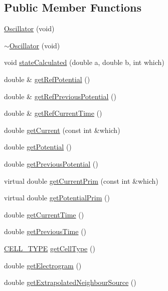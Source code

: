 \subsection*{Public Member Functions}
\begin{DoxyCompactItemize}
\item 
\hyperlink{class_oscillator_aad43fa7eeffdeb0cbc4767f2de538d80}{Oscillator} (void)
\item 
\hyperlink{class_oscillator_accb2f4ecc6604b2c38a7fd9973578360}{$\sim$\+Oscillator} (void)
\item 
void \hyperlink{class_oscillator_abc5d43aeb061d97dd58749baf2b8f82d}{state\+Calculated} (double a, double b, int which)
\item 
double \& \hyperlink{class_oscillator_a6d6d8ef3c022f6fd8c31c3e50987a822}{get\+Ref\+Potential} ()
\item 
double \& \hyperlink{class_oscillator_a734d7375586e9982a6419d1f08b63c57}{get\+Ref\+Previous\+Potential} ()
\item 
double \& \hyperlink{class_oscillator_ac82b2732257e64c0f84f5b520ef16704}{get\+Ref\+Current\+Time} ()
\item 
double \hyperlink{class_oscillator_a2dcfd98ad9d0c6e03cc07f84dd5f054a}{get\+Current} (const int \&which)
\item 
double \hyperlink{class_oscillator_a6ababfb0cb31e5dbf26b4d60a0d0bb16}{get\+Potential} ()
\item 
double \hyperlink{class_oscillator_a6272096989cb47a1cf43fd3aee78fdf5}{get\+Previous\+Potential} ()
\item 
virtual double \hyperlink{class_oscillator_a6132c7be8737a5686d64629b68b81743}{get\+Current\+Prim} (const int \&which)
\item 
virtual double \hyperlink{class_oscillator_a932fda2705d851fbe28c569547f4b4f1}{get\+Potential\+Prim} ()
\item 
double \hyperlink{class_oscillator_a6e403f6aa9e2cd9ff8aea1aefdb9459c}{get\+Current\+Time} ()
\item 
double \hyperlink{class_oscillator_a0768ee28a72db7e13e14fb717408292c}{get\+Previous\+Time} ()
\item 
\hyperlink{heart_defines_8h_a2f059cd81f362503874790462d535f5b}{C\+E\+L\+L\+\_\+\+T\+Y\+P\+E} \hyperlink{class_oscillator_aa0ae5ca40fa136d70b145d490646b8aa}{get\+Cell\+Type} ()
\item 
double \hyperlink{class_oscillator_a2eb50a29aeac6a63b4b8212d1b4cc097}{get\+Electrogram} ()
\item 
double \hyperlink{class_oscillator_a5051ab41b5036cb775faaa5f97e2c182}{get\+Extrapolated\+Neighbour\+Source} ()

\end{DoxyCompactItemize}
